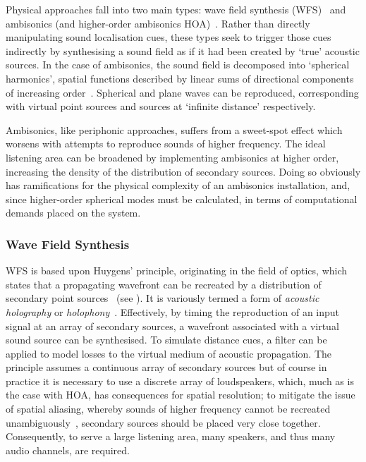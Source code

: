 Physical approaches fall into two main types: wave field synthesis
(WFS)~\citep{berkhout_acoustic_1993} and
ambisonics (and higher-order ambisonics \textemdash{}
HOA)~\citep{frank_producing_2015}.
Rather than directly manipulating sound localisation cues, these types seek to
trigger those cues indirectly by synthesising a sound field as if it had been
created by `true' acoustic sources.
In the case of ambisonics, the sound field is decomposed into `spherical
harmonics', spatial functions described by linear sums of directional
components of increasing order~\citep{nicol_sound_2017}.
Spherical and plane waves can be reproduced, corresponding with virtual
point sources and sources at `infinite distance' respectively.

Ambisonics, like periphonic approaches, suffers from a sweet-spot effect which
worsens with attempts to reproduce sounds of higher frequency.
The ideal listening area can be broadened by implementing ambisonics at higher
order, increasing the density of the distribution of secondary sources.
Doing so obviously has ramifications for the physical complexity of an
ambisonics installation, and, since higher-order spherical modes must be
calculated, in terms of computational demands placed on the system.

\subsubsection{Wave Field Synthesis}

WFS is based upon Huygens' principle, originating in the field of optics, which
states that a propagating wavefront can be recreated by a distribution of
secondary point sources~\citep{mueller_acoustic_1971,berkhout_acoustic_1993,
    belloch_performance_2021} (see ).
It is variously termed a form of \textit{acoustic holography} or
\textit{holophony}~\citep{berkhout_holographic_1988,ahrens_analytic_2012}.
Effectively, by timing the reproduction of an input signal at an array of
secondary sources, a wavefront associated with a virtual sound source can be
synthesised.
To simulate distance cues, a filter can be applied to model losses to the
virtual medium of acoustic propagation.
The principle assumes a continuous array of secondary sources but of course in
practice it is necessary to use a discrete array of loudspeakers, which,
much as is the case with HOA, has consequences for spatial resolution;
to mitigate the issue of spatial aliasing, whereby sounds of higher frequency
cannot be recreated unambiguously~\citep{winter_geometric_2018}, secondary
sources should be placed very close together.
Consequently, to serve a large listening area, many speakers, and thus many
audio channels, are required.

